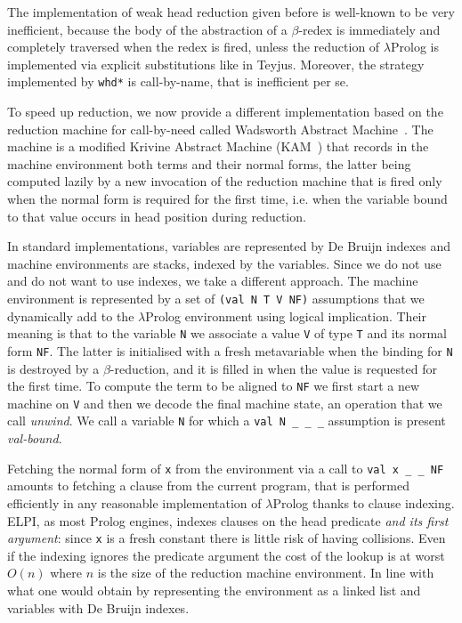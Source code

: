 The implementation of weak head reduction given before is well-known to be very inefficient, because the body of the abstraction of a $\beta$-redex is immediately and completely traversed when the redex is fired, unless the reduction of $\lambda$Prolog is implemented via explicit substitutions like in Teyjus. Moreover, the strategy implemented by \verb+whd*+ is call-by-name, that is inefficient per se.

To speed up reduction, we now provide a different implementation based on the reduction machine for call-by-need called Wadsworth Abstract Machine~\cite{beniamino}. The machine is a modified Krivine Abstract Machine (KAM~\cite{kam}) that records in the machine environment both terms and their normal forms, the latter being computed lazily by a new invocation of the reduction machine that is fired only when the normal form is required for the first time, i.e. when the variable bound to that value occurs in head position during reduction.

In standard implementations, variables are represented by De Bruijn indexes and machine environments are stacks, indexed by the variables. Since we do not use and do not want to use indexes, we take a different approach. The machine environment is represented by a set of \verb+(val N T V NF)+ assumptions that we dynamically add to the $\lambda$Prolog environment using logical implication. Their meaning is that to the variable \verb+N+ we associate a value \verb+V+ of type \verb+T+ and its normal form \verb+NF+. The latter is initialised with a fresh metavariable when the binding for \verb+N+ is destroyed by a $\beta$-reduction, and it is filled in when the value is requested for the first time. To compute the term to be aligned to \verb+NF+ we first start a new machine on \verb+V+ and then we decode the final machine state, an operation that we call \emph{unwind}.  We call a variable \verb+N+ for which a \verb+val N _ _ _+ assumption is present \emph{val-bound}.

Fetching the normal form of \verb+x+ from the environment via a call to \verb+val x _ _ NF+ amounts to fetching a clause from the current program, that is performed efficiently in any reasonable implementation of $\lambda$Prolog thanks to clause indexing.  ELPI, as most Prolog engines, indexes clauses on the head predicate \emph{and its first argument}: since \verb+x+ is a fresh constant there is little risk of having collisions.  Even if the indexing ignores the predicate argument the cost of the lookup is at worst $O(n)$ where $n$ is the size of the reduction machine environment.  In line with what one would obtain by representing the environment as a linked list and variables with De Bruijn indexes.

